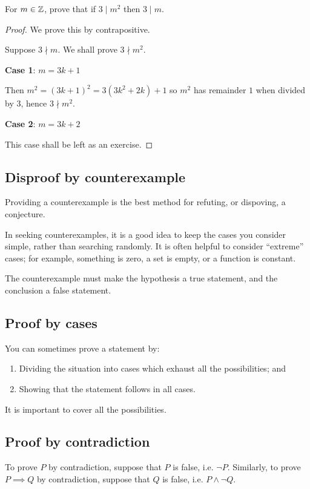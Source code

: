 \begin{exercise}{}{}
For $m\in\mathbb Z$, prove that if $3\mid m^2$ then $3\mid m$.
\end{exercise}
\begin{proof}
We prove this by contrapositive.

Suppose $3\nmid m$. We shall prove $3\nmid m^2$.

\textbf{Case 1}: $m=3k+1$

Then $m^2=(3k+1)^2=3(3k^2+2k)+1$ so $m^2$ has remainder $1$ when divided by $3$, hence $3\nmid m^2$.

\textbf{Case 2}: $m=3k+2$

This case shall be left as an exercise.
\end{proof}

\subsection{Disproof by counterexample}
Providing a counterexample is the best method for refuting, or dispoving, a conjecture. 

In seeking counterexamples, it is a good idea to keep the cases you consider simple, rather than searching randomly. It is often helpful to consider ``extreme'' cases; for example, something is zero, a set is empty, or a function is constant.

The counterexample must make the hypothesis a true statement, and the conclusion a false statement.

\subsection{Proof by cases}
You can sometimes prove a statement by:
\begin{enumerate}
\item Dividing the situation into cases which exhaust all the possibilities; and
\item Showing that the statement follows in all cases.
\end{enumerate}

\begin{remark}
It is important to cover all the possibilities.
\end{remark}

\subsection{Proof by contradiction}
To prove $P$ by contradiction, suppose that $P$ is false, i.e. $\lnot P$. Similarly, to prove $P \implies Q$ by contradiction, suppose that $Q$ is false, i.e. $P\land\lnot Q$.

